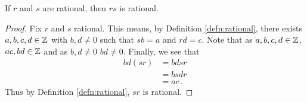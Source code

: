 \guard




\begin{prop}
\label{prop:productOfRaionalsIsRational}
  If $r$ and $s$ are rational, then $rs$ is rational.
\end{prop}
\begin{proof}
  Fix $r$ and $s$ rational.
  This means, by Definition \ref{defn:rational}, there exists $a,b,c,d\in\mathbb{Z}$ with $b,d\not=0$ such that $sb=a$ and $rd=c$.
  Note that as $a,b,c,d\in\mathbb{Z}$, $ac,bd\in\mathbb{Z}$ and as $b,d\not=0$ $bd\not=0$.
  Finally, we see that
  \begin{align*}
    bd(sr)  &= bdsr \\
            &= bsdr \\
            &= ac\,.
  \end{align*}
  Thus by Definition \ref{defn:rational}, $sr$ is rational.
\end{proof}
